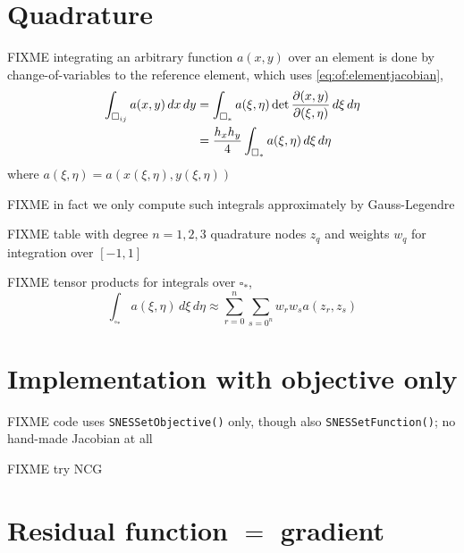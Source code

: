 \section{Quadrature}

FIXME integrating an arbitrary function $a(x,y)$ over an element is done by change-of-variables to the reference element, which uses \eqref{eq:of:elementjacobian},
\begin{align}
\int_{\square_{ij}} a(x,y)\,dx\,dy &= \int_{\square_\ast} a(\xi,\eta) \det\frac{\partial(x,y)}{\partial(\xi,\eta)}\,d\xi\,d\eta  \label{eq:of:changeofvars} \\
&= \frac{h_x h_y}{4} \int_{\square_\ast} a(\xi,\eta) \,d\xi\,d\eta \notag
\end{align}
where $a(\xi,\eta)=a(x(\xi,\eta),y(\xi,\eta))$

FIXME in fact we only compute such integrals approximately by Gauss-Legendre

FIXME table with degree $n=1,2,3$ quadrature nodes $z_q$ and weights $w_q$ for integration over $[-1,1]$

FIXME tensor products for integrals over $\square_\ast$,
    $$\int_{\square_\ast} a(\xi,\eta) \,d\xi\,d\eta \approx \sum_{r=0}^n \sum_{s=0^n} w_r w_s a(z_r,z_s)$$


\clearpage
\newpage
\section{Implementation with objective only}

FIXME code uses \texttt{SNESSetObjective()} only, though also \texttt{SNESSetFunction()}; no hand-made Jacobian at all

FIXME try NCG






\section{Residual function $=$ gradient}



